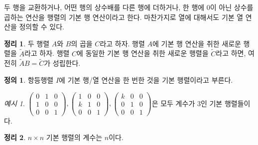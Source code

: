\documentclass[unfonts,oneside,a4paper]{oblivoir}
\theoremstyle{definition}
\newtheorem{definition}{정의}[section]
\theoremstyle{theorem}
\newtheorem{theorem}{정리}[section]
\theoremstyle{theorem}
\theoremstyle{remark}
\theoremstyle{remark}
\theoremstyle{remark}
\newtheorem*{example}{예시}
\theoremstyle{remark}
\begin{document}
두 행을 교환하거나, 어떤 행의 상수배를 다른 행에 더하거나, 한 행에 0이 아닌 상수를 곱하는 연산을 행렬의 기본 행 연산이라고 한다.
마찬가지로 열에 대해서도 기본 열 연산을 정의할 수 있다.

\begin{theorem} \label{thm:elementary_op}
    두 행렬 $A$와 $B$의 곱을 $C$라고 하자.
    행렬 $A$에 기본 행 연산을 취한 새로운 행렬을 $\tilde A$라고 하자.
    행렬 $C$에 동일한 기본 행 연산을 취한 새로운 행렬을 $\tilde C$라고 하면, 여전히 $\tilde A B = \tilde C$가 성립한다.
\end{theorem}

\begin{definition}
    항등행렬 $I$에 기본 행/열 연산을 한 번한 것을 기본 행렬이라고 부른다.
\end{definition}

\begin{example}
    $\begin{pmatrix}
        0 & 1 & 0\\
        1 & 0 & 0\\
        0 & 0 & 1
        \end{pmatrix}, \begin{pmatrix}
        1 & 0 & 0\\
        k & 1 & 0\\
        0 & 0 & 1
        \end{pmatrix}, \begin{pmatrix}
        k & 0 & 0\\
        0 & 1 & 0\\
        0 & 0 & 1
    \end{pmatrix}$은 모두 계수가 3인 기본 행렬들이다.
\end{example}

\begin{theorem} \label{thm:rank_elementary}
    $n \times n$ 기본 행렬의 계수는 $n$이다.
\end{theorem}
\end{document}
